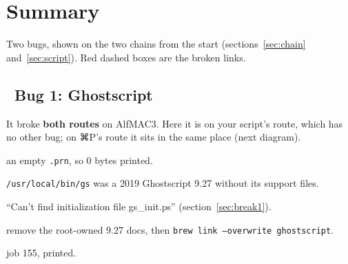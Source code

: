 \documentclass[11pt,a4paper]{article}
\newcommand{\bugemo}{\texttwemoji{lady beetle}}
\begin{document}
\newpage
\section{Summary}

Two bugs, shown on the two chains from the start (sections~\ref{sec:chain} and~\ref{sec:script}). Red dashed boxes are the broken links.

\subsection*{\bugemo\ Bug 1: Ghostscript}

It broke \textbf{both routes} on AlfMAC3. Here it is on your script's route, which has no other bug; on ⌘P's route it sits in the same place (next diagram).

\begin{center}
\end{center}

\begin{description}[nosep, font=\normalfont\bfseries]
  \item[Symptom] an empty \texttt{.prn}, so 0 bytes printed.
  \item[Cause] \texttt{/usr/local/bin/gs} was a 2019 Ghostscript 9.27 without its support files.
  \item[Evidence] ``Can't find initialization file gs\_init.ps'' (section~\ref{sec:break1}).
  \item[Fix] remove the root-owned 9.27 docs, then \texttt{brew link --overwrite ghostscript}.
  \item[Proof] job 155, printed.
\end{description}
\end{document}
